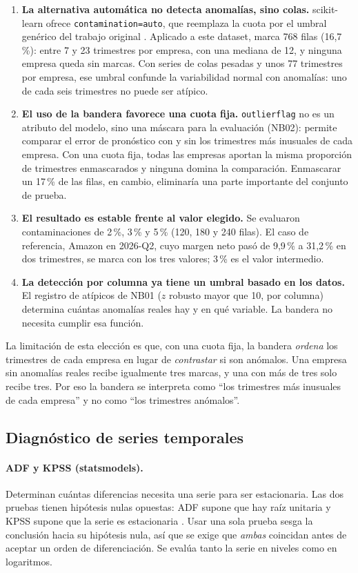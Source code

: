 \documentclass[12pt,letterpaper,oneside]{report}
\renewcommand{\_}{\UnderscoreOriginal\allowbreak}
\begin{document}
\begin{enumerate}
  \item \textbf{La alternativa automática no detecta anomalías, sino colas.} scikit-learn ofrece \texttt{contamination=auto}, que reemplaza la cuota por el umbral genérico del trabajo original \parencite{Liu2008}. Aplicado a este dataset, marca 768 filas (16,7\,\%): entre 7 y 23 trimestres por empresa, con una mediana de 12, y ninguna empresa queda sin marcas. Con series de colas pesadas y unos 77 trimestres por empresa, ese umbral confunde la variabilidad normal con anomalías: uno de cada seis trimestres no puede ser atípico.
  \item \textbf{El uso de la bandera favorece una cuota fija.} \texttt{outlier\_flag} no es un atributo del modelo, sino una máscara para la evaluación (NB02): permite comparar el error de pronóstico con y sin los trimestres más inusuales de cada empresa. Con una cuota fija, todas las empresas aportan la misma proporción de trimestres enmascarados y ninguna domina la comparación. Enmascarar un 17\,\% de las filas, en cambio, eliminaría una parte importante del conjunto de prueba.
  \item \textbf{El resultado es estable frente al valor elegido.} Se evaluaron contaminaciones de 2\,\%, 3\,\% y 5\,\% (120, 180 y 240 filas). El caso de referencia, Amazon en 2026-Q2, cuyo margen neto pasó de 9,9\,\% a 31,2\,\% en dos trimestres, se marca con los tres valores; 3\,\% es el valor intermedio.
  \item \textbf{La detección por columna ya tiene un umbral basado en los datos.} El registro de atípicos de NB01 ($z$ robusto mayor que 10, por columna) determina cuántas anomalías reales hay y en qué variable. La bandera no necesita cumplir esa función.
\end{enumerate}

La limitación de esta elección es que, con una cuota fija, la bandera \emph{ordena} los trimestres de cada empresa en lugar de \emph{contrastar} si son anómalos. Una empresa sin anomalías reales recibe igualmente tres marcas, y una con más de tres solo recibe tres. Por eso la bandera se interpreta como ``los trimestres más inusuales de cada empresa'' y no como ``los trimestres anómalos''.

\subsection{Diagnóstico de series temporales}

\paragraph{ADF y KPSS (statsmodels).} Determinan cuántas diferencias necesita una serie para ser estacionaria. Las dos pruebas tienen hipótesis nulas opuestas: ADF supone que hay raíz unitaria \parencite{dickey1979distribution} y KPSS supone que la serie es estacionaria \parencite{kwiatkowski1992testing}. Usar una sola prueba sesga la conclusión hacia su hipótesis nula, así que se exige que \emph{ambas} coincidan antes de aceptar un orden de diferenciación. Se evalúa tanto la serie en niveles como en logaritmos.
\end{document}
